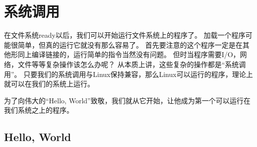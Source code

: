 \chapter{系统调用}

在文件系统ready以后，我们可以开始运行文件系统上的程序了。
加载一个程序可能很简单，但真的运行它就没有那么容易了。
首先要注意的这个程序一定是在其他形同上编译链接的，运行简单的指令当然没有问题。
但时当程序需要I/O，网络，文件等等复杂操作该怎么办呢？
从本质上讲，这些复杂的操作都是“系统调用”。
只要我们的系统调用与Linux保持兼容，那么Linux可以运行的程序，理论上就可以在我们的系统上运行。

为了向伟大的“Hello, World”致敬，我们就从它开始，让他成为第一个可以运行在我们系统之上的程序。
\section{Hello, World}

